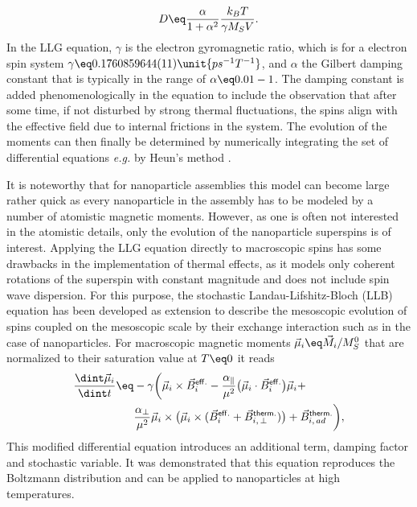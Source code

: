 \documentclass[\main/dresen_thesis.tex]{subfiles}
\begin{document}
      \begin{align}
        D \eq \frac{\alpha}{1 + \alpha^2} \frac{k_B T}{\gamma M_S V}.
      \end{align}
      In the LLG equation, $\gamma$ is the electron gyromagnetic ratio, which is for a electron spin system $\gamma \eq 0.1760859644(11) \unit{ps^{-1} T^{-1}}$, and $\alpha$ the Gilbert damping constant that is typically in the range of $\alpha \eq 0.01 - 1$.
      The damping constant is added phenomenologically in the equation to include the observation that after some time, if not disturbed by strong thermal fluctuations, the spins align with the effective field due to internal frictions in the system.
      The evolution of the moments can then finally be determined by numerically integrating the set of differential equations \textit{e.g.} by Heun's method \cite{Sueli_2003_Anint}.

      It is noteworthy that for nanoparticle assemblies this model can become large rather quick as every nanoparticle in the assembly has to be modeled by a number of atomistic magnetic moments.
      However, as one is often not interested in the atomistic details, only the evolution of the nanoparticle superspins is of interest.
      Applying the LLG equation directly to macroscopic spins has some drawbacks in the implementation of thermal effects, as it models only coherent rotations of the superspin with constant magnitude and does not include spin wave dispersion.
      For this purpose, the stochastic Landau-Lifshitz-Bloch (LLB) equation \cite{Evans_2012_Stoch, Atxitia_2017_Funda} has been developed as extension to describe the mesoscopic evolution of spins coupled on the mesoscopic scale by their exchange interaction such as in the case of nanoparticles. For macroscopic magnetic moments $\vec{\mu}_i \eq \vec{M}_i / M_S^0$ that are normalized to their saturation value at $T \eq 0$ it reads
      \begin{align}
        \begin{split}
          \frac{\dint \vec{\mu}_i}{\dint t} \eq&
            - \gamma \biggl(
              \vec{\mu}_i \times \vec{B}_i^\mathsf{eff.} -
              \frac{\alpha_\parallel}{\mu^2} \bigl(\vec{\mu}_i \cdot \vec{B}_i^\mathsf{eff.} \bigr) \vec{\mu}_i +\\
              &\frac{\alpha_\bot}{\mu^2} \vec{\mu}_i \times \bigl(\vec{\mu}_i \times (\vec{B}_i^\mathsf{eff.} + \vec{B}^\mathsf{therm.}_{i, \, \bot}) \bigr) +  \vec{B}^\mathsf{therm.}_{i, \, ad} \biggr),
        \end{split}
      \end{align}
      This modified differential equation introduces an additional term, damping factor and stochastic variable.
      It was demonstrated that this equation reproduces the Boltzmann distribution and can be applied to nanoparticles at high temperatures.
\end{document}
